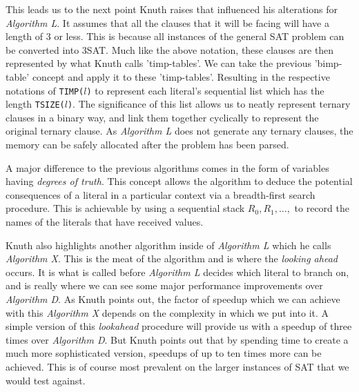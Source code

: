 \documentclass{article}
\begin{document}
This leads us to the next point Knuth raises that influenced his alterations for \textit{Algorithm L}. It assumes that all the
clauses that it will be facing will have a length of 3 or less. This is because all instances of the general SAT problem can be
converted into 3SAT. Much like the above notation, these clauses are then represented by what Knuth calls 'timp-tables'. We can
take the previous 'bimp-table' concept and apply it to these 'timp-tables'. Resulting in the respective notations of
\texttt{TIMP($l$)} to represent each literal's sequential list which has the length \texttt{TSIZE($l$)}. The significance of this
list allows us to neatly represent ternary clauses in a binary way, and link them together cyclically to represent the original
ternary clause. As \textit{Algorithm L} does not generate any ternary clauses, the memory can be safely allocated after the
problem has been parsed. 

A major difference to the previous algorithms comes in the form of variables having \textit{degrees of truth}. This concept allows
the algorithm to deduce the potential consequences of a literal in a particular context via a breadth-first search procedure. This
is achievable by using a sequential stack $R_0, R_1, ...,$ to record the names of the literals that have received values.

Knuth also highlights another algorithm inside of \textit{Algorithm L} which he calls \textit{Algorithm X}. This is the meat of
the algorithm and is where the \textit{looking ahead} occurs. It is what is called before \textit{Algorithm L} decides which
literal to branch on, and is really where we can see some major performance improvements over \textit{Algorithm D}. As Knuth
points out, the factor of speedup which we can achieve with this \textit{Algorithm X} depends on the complexity in which we put
into it. A simple version of this \textit{lookahead} procedure will provide us with a speedup of three times over
\textit{Algorithm D}. But Knuth points out that by spending time to create a much more sophisticated version, speedups of up to
ten times more can be achieved. This is of course most prevalent on the larger instances of SAT that we would test against. 
\end{document}
